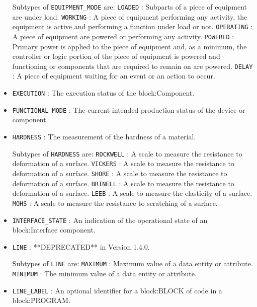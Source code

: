\begin{itemize}
Subtypes of \texttt{EQUIPMENT_MODE} are: 
\newline\tab \texttt{LOADED} : Subparts of a piece of equipment are under load. 
\newline\tab \texttt{WORKING} : A piece of equipment performing any activity, the equipment is active and performing a function under load or not. 
\newline\tab \texttt{OPERATING} : A piece of equipment are powered or performing any activity. 
\newline\tab \texttt{POWERED} : Primary  power is  applied  to the  piece  of  equipment and,  as  a minimum, the controller or logic portion of the piece of equipment is powered and functioning or components that are required to remain on are powered. 
\newline\tab \texttt{DELAY} : A piece of equipment waiting for an event or an action to occur. 
\item \texttt{EXECUTION} : The execution status of the {block:Component}. 

\item \texttt{FUNCTIONAL_MODE} : The current intended production status of the device or component. 

\item \texttt{HARDNESS} : The measurement of the hardness of a material. 

Subtypes of \texttt{HARDNESS} are: 
\newline\tab \texttt{ROCKWELL} : A scale to measure the resistance to deformation of a surface. 
\newline\tab \texttt{VICKERS} : A scale to measure the resistance to deformation of a surface. 
\newline\tab \texttt{SHORE} : A scale to measure the resistance to deformation of a surface. 
\newline\tab \texttt{BRINELL} : A scale to measure the resistance to deformation of a surface. 
\newline\tab \texttt{LEEB} : A scale to measure the elasticity of a surface. 
\newline\tab \texttt{MOHS} : A scale to measure the resistance to scratching of a surface. 
\item \texttt{INTERFACE_STATE} : An indication of the operational state of an {block:Interface} component. 

\item \texttt{LINE} : **DEPRECATED** in Version 1.4.0. 

Subtypes of \texttt{LINE} are: 
\newline\tab \texttt{MAXIMUM} : Maximum value of a data entity or attribute. 
\newline\tab \texttt{MINIMUM} : The minimum value of a data entity or attribute. 
\item \texttt{LINE_LABEL} : An optional identifier for a {block:BLOCK} of code in a {block:PROGRAM}. 


\end{itemize}
